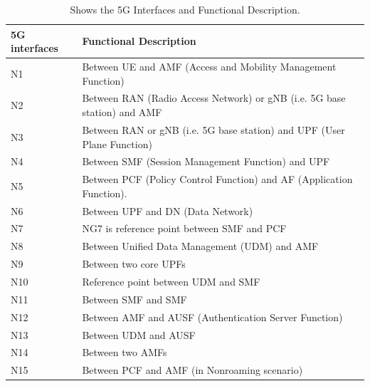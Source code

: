  \begin{table}[h!]
\centering
\begin{tabular}{|p{2.3cm}| p{8.5 cm} |} 

 \hline
 \cellcolor[HTML]{23a5e2} \color[HTML]{ffffff} \textbf{5G interfaces} &\cellcolor[HTML]{23a5e2} \color[HTML]{ffffff} \textbf{Functional Description}    \\ 
 \hline
N1 & Between UE and AMF (Access and Mobility Management Function)  \\ 
  \hline
N2 & Between RAN (Radio Access Network) or gNB (i.e. 5G base station) and AMF  \\ 
  \hline
N3 & Between RAN or gNB (i.e. 5G base station) and UPF (User Plane Function) \\ 
  \hline
N4 & Between SMF (Session Management Function) and UPF
  \\ 
 \hline
  N5 & Between PCF (Policy Control Function) and AF (Application Function).
  \\ 
  \hline
N6 & Between UPF and DN (Data Network)
  \\ 
  \hline
N7 & NG7 is reference point between SMF and PCF 
  \\ 
  \hline
N8 & Between Unified Data Management (UDM) and AMF  \\ 
  \hline
N9 &  Between two core UPFs \\ 
\hline
  N10 &  Reference point between UDM and SMF\\ 
  \hline
N11 & Between SMF and SMF  \\ 
  \hline
N12 & Between AMF and AUSF (Authentication Server Function)    \\ 
  \hline
N13 & Between UDM and AUSF  \\ 
  \hline
N14 & Between two AMFs  \\ 
\hline
  N15 & Between PCF and AMF (in Nonroaming scenario)  \\ 
  \hline
\end{tabular}
\caption{Shows the 5G Interfaces and Functional Description.}
\label{table: 5G_interfaces_and_the_functional_Description}
\end{table}

 
 
 
 
 
 
 
 
 
 
 


